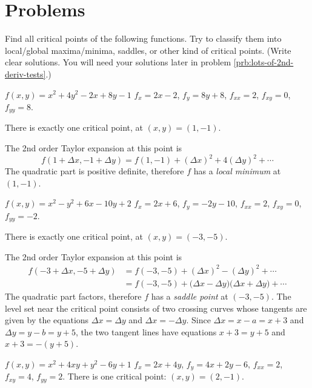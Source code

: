 \newpage
\section{Problems}  
\begin{multicols}{2}
\problemfont
\problem\label{prb:find-critical-points}  
Find all critical points of the following functions.  Try to classify
them into local/global maxima/minima, saddles, or other kind of
critical points.  (Write clear solutions.  You will need your
solutions later in problem \ref{prb:lots-of-2nd-deriv-tests}.)

\subprob $f(x,y)=x^2+4y^2-2x+8y-1$
%
\answer 
$f_x = 2x-2$, $f_y = 8y+8$, $f_{xx} = 2$, $f_{xy}=0$, $f_{yy}=8$.

There is exactly one critical point, at $(x, y) = (1,-1)$.

The 2nd order Taylor expansion at this point is 
\[
f(1+\Delta x, -1+\Delta y) = 
f(1, -1) + (\Delta x)^2 + 4(\Delta y)^2 +\cdots
\]
The quadratic part is positive definite, therefore $f$ has a
\emph{local minimum} at $(1, -1)$.
\endanswer

\subprob $f(x,y)=x^2-y^2+6x-10y+2$ 
%
\answer 
$f_x = 2x+6$, $f_y = -2y-10$, $f_{xx} = 2$, $f_{xy}=0$, $f_{yy}=-2$.

There is exactly one critical point, at $(x, y) = (-3,-5)$.

The 2nd order Taylor expansion at this point is 
\begin{align*}
  f(-3+\Delta x, -5+\Delta y)
  &= f(-3, -5) + (\Delta x)^2 - (\Delta y)^2 +\cdots \\
  &= f(-3, -5) +\bigl(\Delta x-\Delta y\bigr)\bigl(\Delta x +\Delta
  y\bigr)+\cdots
\end{align*}
The quadratic part factors, therefore $f$ has a
\emph{saddle point} at $(-3, -5)$.  The level set near the critical
point consists of two crossing curves whose tangents are given by the
equations $\Delta x=\Delta y$ and $\Delta x=-\Delta y$.  Since
$\Delta x=x-a=x+3$ and $\Delta y = y-b = y+5$, the two tangent lines
have equations $x+3 = y+5$ and $x+3 = -(y+5)$.
%

\endanswer

\subprob $f(x,y)=x^2+4xy+y^2-6y+1$ 
\label{prb:find-cpt-01}
\answer 
$f_x = 2x+4y$, $f_y = 4x+2y-6$, $f_{xx} = 2$, $f_{xy}=4$, $f_{yy}=2$.
There is one critical point: $(x,y) = (2, -1)$.


\end{multicols}

